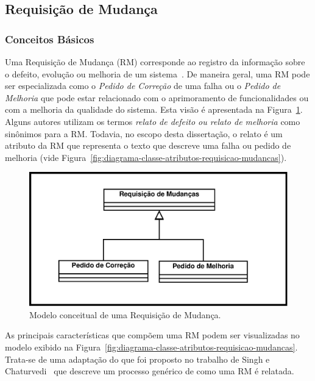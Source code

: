 \subsection{Requisição de Mudança}\label{sec:requisicao_de_mudanca}

\subsubsection{Conceitos Básicos}\label{subsec:tipos_de_requisicoes_mudanca}

Uma Requisição de Mudança (RM) corresponde ao registro da informação sobre o
defeito, evolução ou melhoria de um sistema~\cite{tripathy2014software}. De
maneira geral, uma RM pode ser especializada como o \textit{Pedido de Correção}
de uma falha ou o \textit{Pedido de Melhoria} que pode estar relacionado com o
aprimoramento de funcionalidades ou com a melhoria da qualidade do sistema. Esta
visão é apresentada na Figura~\ref{fig:diagrama-classe-requisicao-mudancas}.
Alguns autores utilizam os termos \textit{relato de defeito ou relato de
    melhoria} como sinônimos para a RM\@. Todavia, no escopo desta dissertação,
o relato é um atributo da RM que representa o texto que descreve uma falha ou
pedido de melhoria (vide
Figura~\ref{fig:diagrama-classe-atributos-requisicao-mudancas}).

\begin{figure}[htpb]
	\centering
	\includegraphics[width=0.5\linewidth]{./chapter-manutencao-software-visao-geral/img/diagrama-classe-conceitual-requisicao-mudancas.pdf}
	\caption{Modelo conceitual de uma Requisição de Mudança.}\label{fig:diagrama-classe-requisicao-mudancas}
\end{figure}

As principais características que compõem uma RM podem ser visualizadas no
modelo exibido na
Figura~\ref{fig:diagrama-classe-atributos-requisicao-mudancas}. Trata-se de uma
adaptação do que foi proposto no trabalho de Singh e
Chaturvedi~\cite{singh2011bug} que descreve um processo genérico de como uma RM
é relatada.


